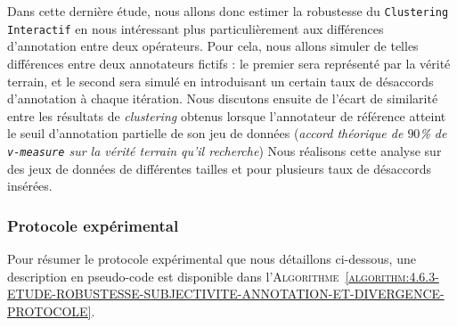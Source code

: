 		Dans cette dernière étude, nous allons donc estimer la robustesse du \texttt{Clustering Interactif} en nous intéressant plus particulièrement aux différences d'annotation entre deux opérateurs.
		Pour cela, nous allons simuler de telles différences entre deux annotateurs fictifs : le premier sera représenté par la vérité terrain, et le second sera simulé en introduisant un certain taux de désaccords d'annotation à chaque itération.
		Nous discutons ensuite de l'écart de similarité entre les résultats de \textit{clustering} obtenus lorsque l'annotateur de référence atteint le seuil d'annotation partielle de son jeu de données (\textit{accord théorique de $90$\% de \texttt{v-measure} sur la vérité terrain qu'il recherche})
		Nous réalisons cette analyse sur des jeux de données de différentes tailles et pour plusieurs taux de désaccords insérées.
	
		\subsubsection{Protocole expérimental}
			
			Pour résumer le protocole expérimental que nous détaillons ci-dessous, une description en pseudo-code est disponible dans l'\textsc{Algorithme~\ref{algorithm:4.6.3-ETUDE-ROBUSTESSE-SUBJECTIVITE-ANNOTATION-ET-DIVERGENCE-PROTOCOLE}}.
			
